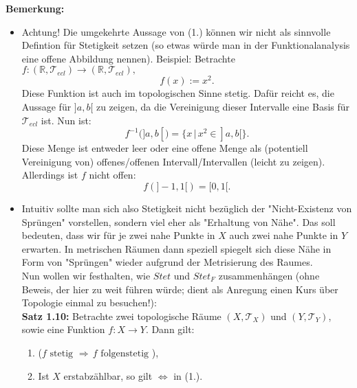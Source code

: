 \documentclass[11pt,english]{smfart}
\begin{document}
\textbf{Bemerkung:} 
\begin{itemize}
\item Achtung! Die umgekehrte Aussage von (1.) können wir nicht als sinnvolle Defintion für Stetigkeit setzen (so etwas würde man in der Funktionalanalysis eine offene Abbildung nennen). Beispiel: Betrachte \(f : (\mathbb{R}, \mathcal{T}_{ecl}) \to (\mathbb{R}, \mathcal{T}_{ecl}),\)
\begin{equation}
    f(x) := x^2.
\end{equation}
Diese Funktion ist auch im topologischen Sinne stetig. Dafür reicht es, die Aussage für \(]a,b[\) zu zeigen, da die Vereinigung dieser Intervalle eine Basis für \(\mathcal{T}_{ecl}\) ist. Nun ist:
\begin{equation}
    f^{-1}(]a,b[) = \{x \, | \, x^2 \in ]a,b[\}.
\end{equation}
Diese Menge ist entweder leer oder eine offene Menge als (potentiell Vereinigung von) offenes/offenen Intervall/Intervallen (leicht zu zeigen). Allerdings ist \(f\) nicht offen:
\begin{equation}
    f(]-1,1[) = [0,1[.
\end{equation}
\item Intuitiv sollte man sich also Stetigkeit nicht bezüglich der "Nicht-Existenz von Sprüngen" vorstellen, sondern viel eher als "Erhaltung von Nähe". Das soll bedeuten, dass wir für je zwei nahe Punkte in \(X\) auch zwei nahe Punkte in \(Y\) erwarten. In metrischen Räumen dann speziell spiegelt sich diese Nähe in Form von "Sprüngen" wieder aufgrund der Metrisierung des Raumes.\\

Nun wollen wir festhalten, wie \(Stet\) und \(Stet_F\) zusammenhängen (ohne Beweis, der hier zu weit führen würde; dient als Anregung einen Kurs über Topologie einmal zu besuchen!):\\[0.5cm]
\textbf{Satz 1.10:} Betrachte zwei topologische Räume \((X,\mathcal{T}_X)\) und \((Y,\mathcal{T}_Y)\), sowie eine Funktion \(f : X \to Y\). Dann gilt:
\begin{enumerate}
    \item (\(f \text{ stetig }\Rightarrow \, f \text{ folgenstetig }\)),
    \item Ist \(X\) erstabzählbar, so gilt \(\Leftrightarrow\) in (1.).
\end{enumerate}
\end{itemize}
\end{document}
